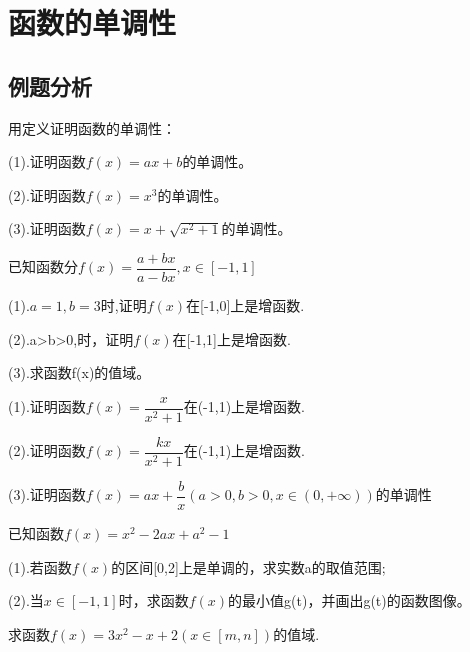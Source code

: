 \chapter{函数的单调性}
\section{例题分析}
\begin{example}
	用定义证明函数的单调性：\par
	(1).证明函数$f(x)=ax+b$的单调性。\par
\vspace{2.8cm}
	(2).证明函数$f(x)=x^3$的单调性。\par
	\vspace{2.8cm}
	(3).证明函数$f(x)=x+\sqrt{x^2+1}$的单调性。\par
	\vspace{2.8cm}

\end{example}
\begin{example}
已知函数分$f(x)=\dfrac{a+bx}{a-bx},x\in [-1,1]$	\par
(1).$a=1,b=3$时,证明$f(x)$在[-1,0]上是增函数.\par
(2).a>b>0,时，证明$f(x)$在[-1,1]上是增函数.\par
(3).求函数f(x)的值域。\par
\vspace{5.5cm}
\end{example}
\begin{example}\par
	(1).证明函数$f(x)=\dfrac{x}{x^2+1}$在(-1,1)上是增函数.\par
	(2).证明函数$f(x)=\dfrac{kx}{x^2+1}$在(-1,1)上是增函数.\par
	(3).证明函数$f(x)=ax+\dfrac{b}{x}(a>0,b>0,x\in(0,+\infty))$的单调性\par
	\vspace{4cm}
\end{example}
\begin{example}
	已知函数$f(x)=x^2-2ax+a^2-1$\par
	(1).若函数$f(x)$的区间[0,2]上是单调的，求实数a的取值范围;\par
	(2).当$x\in [-1,1]$时，求函数$f(x)$的最小值g(t)，并画出g(t)的函数图像。
	\vspace{4cm}
\end{example}
\begin{example}
	求函数$f(x)=3x^2-x+2(x\in [m,n])$的值域.
\end{example}